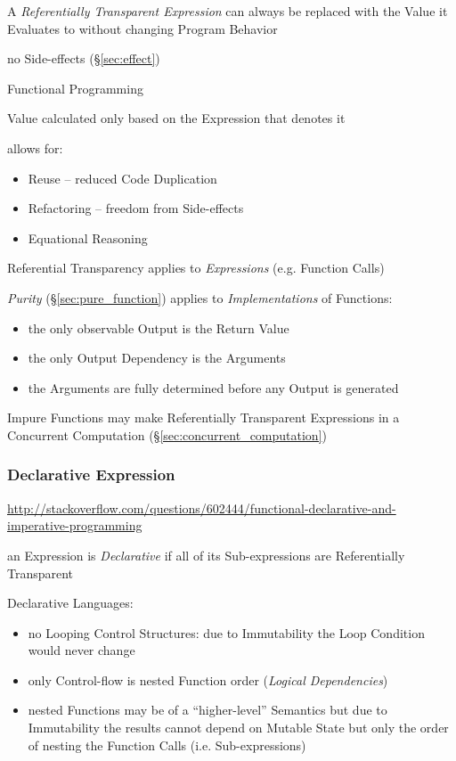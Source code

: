 
A \emph{Referentially Transparent Expression} can always be replaced
with the Value it Evaluates to without changing Program Behavior

no Side-effects (\S\ref{sec:effect})

Functional Programming

Value calculated only based on the Expression that
denotes it

allows for:
\begin{itemize}
\item Reuse -- reduced Code Duplication
\item Refactoring -- freedom from Side-effects
\item Equational Reasoning
\end{itemize}

Referential Transparency applies to \emph{Expressions} (e.g. Function
Calls)

\emph{Purity} (\S\ref{sec:pure_function}) applies to
\emph{Implementations} of Functions:
\begin{itemize}
  \item the only observable Output is the Return Value
  \item the only Output Dependency is the Arguments
  \item the Arguments are fully determined before any Output is
    generated
\end{itemize}

Impure Functions may make Referentially Transparent Expressions in a
Concurrent Computation (\S\ref{sec:concurrent_computation})



\subsubsection{Declarative Expression}\label{sec:declarative_expression}

\url{http://stackoverflow.com/questions/602444/functional-declarative-and-imperative-programming}

an Expression is \emph{Declarative} if all of its Sub-expressions are
Referentially Transparent

Declarative Languages:
\begin{itemize}
  \item no Looping Control Structures: due to Immutability the Loop
    Condition would never change
  \item only Control-flow is nested Function order (\emph{Logical
    Dependencies})
  \item nested Functions may be of a ``higher-level'' Semantics but
    due to Immutability the results cannot depend on Mutable State but
    only the order of nesting the Function Calls (i.e.
    Sub-expressions)
\end{itemize}

